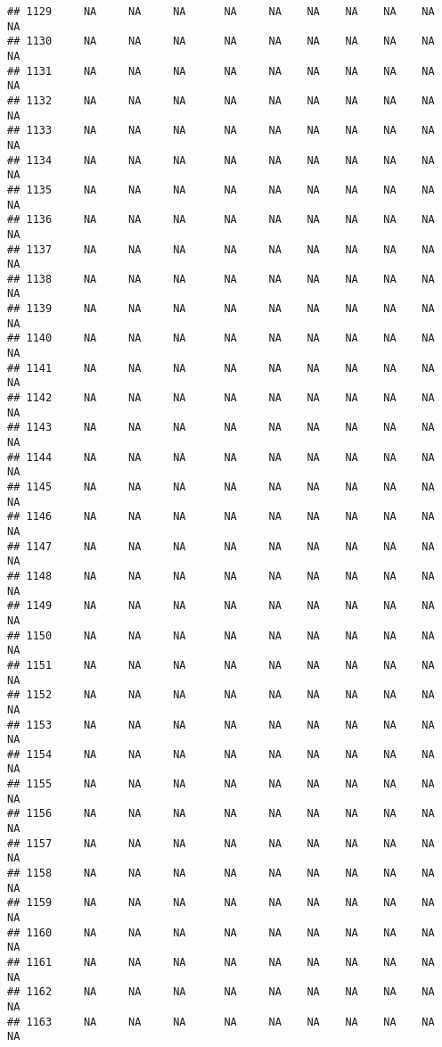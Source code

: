 \documentclass{article}\usepackage{graphicx, color}
\makeatletter
\newenvironment{kframe}{%
 \def\at@end@of@kframe{}%
 \ifinner\ifhmode%
  \def\at@end@of@kframe{\end{minipage}}%
  \begin{minipage}{\columnwidth}%
 \fi\fi%
 \def\FrameCommand##1{\hskip\@totalleftmargin \hskip-\fboxsep
 \colorbox{shadecolor}{##1}\hskip-\fboxsep
     \hskip-\linewidth \hskip-\@totalleftmargin \hskip\columnwidth}%
 \MakeFramed {\advance\hsize-\width
   \@totalleftmargin\z@ \linewidth\hsize
   \@setminipage}}%
 {\par\unskip\endMakeFramed%
 \at@end@of@kframe}
\newenvironment{knitrout}{}{} %
\makeatother
\begin{document}
\begin{knitrout}
\begin{kframe}
\begin{verbatim}
## 1129     NA     NA     NA      NA     NA    NA    NA    NA    NA     NA
## 1130     NA     NA     NA      NA     NA    NA    NA    NA    NA     NA
## 1131     NA     NA     NA      NA     NA    NA    NA    NA    NA     NA
## 1132     NA     NA     NA      NA     NA    NA    NA    NA    NA     NA
## 1133     NA     NA     NA      NA     NA    NA    NA    NA    NA     NA
## 1134     NA     NA     NA      NA     NA    NA    NA    NA    NA     NA
## 1135     NA     NA     NA      NA     NA    NA    NA    NA    NA     NA
## 1136     NA     NA     NA      NA     NA    NA    NA    NA    NA     NA
## 1137     NA     NA     NA      NA     NA    NA    NA    NA    NA     NA
## 1138     NA     NA     NA      NA     NA    NA    NA    NA    NA     NA
## 1139     NA     NA     NA      NA     NA    NA    NA    NA    NA     NA
## 1140     NA     NA     NA      NA     NA    NA    NA    NA    NA     NA
## 1141     NA     NA     NA      NA     NA    NA    NA    NA    NA     NA
## 1142     NA     NA     NA      NA     NA    NA    NA    NA    NA     NA
## 1143     NA     NA     NA      NA     NA    NA    NA    NA    NA     NA
## 1144     NA     NA     NA      NA     NA    NA    NA    NA    NA     NA
## 1145     NA     NA     NA      NA     NA    NA    NA    NA    NA     NA
## 1146     NA     NA     NA      NA     NA    NA    NA    NA    NA     NA
## 1147     NA     NA     NA      NA     NA    NA    NA    NA    NA     NA
## 1148     NA     NA     NA      NA     NA    NA    NA    NA    NA     NA
## 1149     NA     NA     NA      NA     NA    NA    NA    NA    NA     NA
## 1150     NA     NA     NA      NA     NA    NA    NA    NA    NA     NA
## 1151     NA     NA     NA      NA     NA    NA    NA    NA    NA     NA
## 1152     NA     NA     NA      NA     NA    NA    NA    NA    NA     NA
## 1153     NA     NA     NA      NA     NA    NA    NA    NA    NA     NA
## 1154     NA     NA     NA      NA     NA    NA    NA    NA    NA     NA
## 1155     NA     NA     NA      NA     NA    NA    NA    NA    NA     NA
## 1156     NA     NA     NA      NA     NA    NA    NA    NA    NA     NA
## 1157     NA     NA     NA      NA     NA    NA    NA    NA    NA     NA
## 1158     NA     NA     NA      NA     NA    NA    NA    NA    NA     NA
## 1159     NA     NA     NA      NA     NA    NA    NA    NA    NA     NA
## 1160     NA     NA     NA      NA     NA    NA    NA    NA    NA     NA
## 1161     NA     NA     NA      NA     NA    NA    NA    NA    NA     NA
## 1162     NA     NA     NA      NA     NA    NA    NA    NA    NA     NA
## 1163     NA     NA     NA      NA     NA    NA    NA    NA    NA     NA

\end{verbatim}
\end{kframe}
\end{knitrout}
\end{document}
